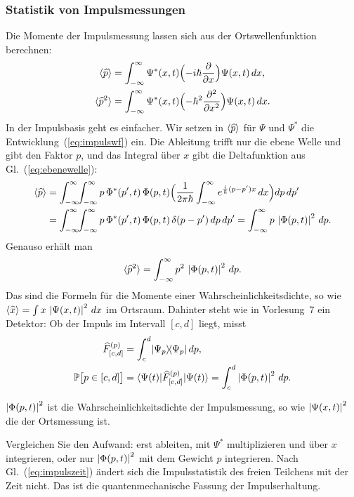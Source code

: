 \subsubsection{Statistik von Impulsmessungen}
Die Momente der Impulsmessung lassen sich aus der Ortswellenfunktion berechnen:
\begin{equation}\label{eq:pmomenteort}
	\begin{split}
		\langle\widehat{p}\rangle &= \int_{-\infty}^{\infty} \Psi^*(x,t)\Bigl(-i\hbar\frac{\partial}{\partial x}\Bigr)\Psi(x,t)\,dx, \\
		\langle\widehat{p}^2\rangle &= \int_{-\infty}^{\infty} \Psi^*(x,t)\Bigl(-\hbar^2\frac{\partial^2}{\partial x^2}\Bigr)\Psi(x,t)\,dx.
	\end{split}
\end{equation}
In der Impulsbasis geht es einfacher. Wir setzen in $\langle\widehat{p}\rangle$ für $\Psi$ und $\Psi^*$ die Entwicklung~(\ref{eq:impulswf}) ein. Die Ableitung trifft nur die ebene Welle und gibt den Faktor $p$, und das Integral über $x$ gibt die Deltafunktion aus Gl.~(\ref{eq:ebenewelle}):
\begin{equation}
	\begin{split}
		\langle\widehat{p}\rangle &= \int_{-\infty}^{\infty}\!\!\int_{-\infty}^{\infty} p\,\Phi^*(p',t)\,\Phi(p,t)\Bigl(\frac{1}{2\pi\hbar}\int_{-\infty}^{\infty} e^{\frac{i}{\hbar}(p-p')x}\,dx\Bigr)dp\,dp' \\
		&= \int_{-\infty}^{\infty}\!\!\int_{-\infty}^{\infty} p\,\Phi^*(p',t)\,\Phi(p,t)\,\delta(p-p')\,dp\,dp' = \int_{-\infty}^{\infty} p\,\left\lvert \Phi(p,t) \right\rvert^2\,dp.
	\end{split}
\end{equation}
Genauso erhält man
\begin{equation}
	\langle\widehat{p}^2\rangle = \int_{-\infty}^{\infty} p^2\,\left\lvert \Phi(p,t) \right\rvert^2\,dp.
\end{equation}
Das sind die Formeln für die Momente einer Wahrscheinlichkeitsdichte, so wie $\langle\widehat{x}\rangle = \int x\,\left\lvert \Psi(x,t) \right\rvert^2\,dx$ im Ortsraum. Dahinter steht wie in Vorlesung~7 ein Detektor: Ob der Impuls im Intervall $[c,d]$ liegt, misst
\begin{equation}
	\begin{split}
		\widehat{F}^{(p)}_{[c,d]} &= \int_c^d \lvert \Psi_p \rangle\!\langle \Psi_p \rvert\,dp, \\
		\mathbb{P}\bigl[p\in[c,d]\bigr] &= \langle \Psi(t) \rvert \widehat{F}^{(p)}_{[c,d]} \lvert \Psi(t) \rangle = \int_c^d \left\lvert \Phi(p,t) \right\rvert^2\,dp.
	\end{split}
\end{equation}
\begin{merksatz}
	$\left\lvert \Phi(p,t) \right\rvert^2$ ist die Wahrscheinlichkeitsdichte der Impulsmessung, so wie $\left\lvert \Psi(x,t) \right\rvert^2$ die der Ortsmessung ist.
\end{merksatz}
Vergleichen Sie den Aufwand: erst ableiten, mit $\Psi^*$ multiplizieren und über $x$ integrieren, oder nur $\left\lvert \Phi(p,t) \right\rvert^2$ mit dem Gewicht $p$ integrieren. Nach Gl.~(\ref{eq:impulszeit}) ändert sich die Impulsstatistik des freien Teilchens mit der Zeit nicht. Das ist die quantenmechanische Fassung der Impulserhaltung.

